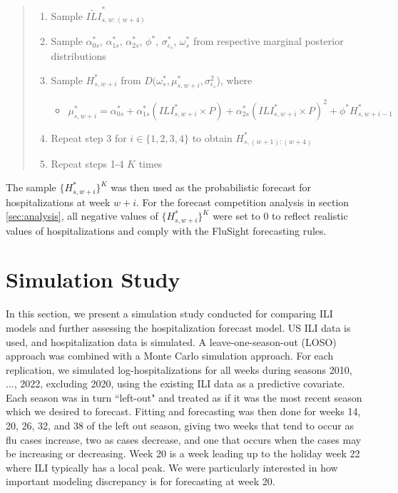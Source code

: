 \begin{quote}
\begin{enumerate}[Step 1:]
  \item Sample $\widetilde{ILI}^*_{s,w:(w + 4)}$
  \item Sample $\alpha_{0s}^*$, $\alpha_{1s}^*$, $\alpha_{2s}^*$, $\phi^*$, 
  $\sigma^*_{\epsilon_s}$, $\omega^*_s$ from respective marginal posterior 
  distributions
  \item Sample $H^*_{s,w + i}$ from $D(\omega_s^*, \mu_{s, w + i}^*,\sigma^2_{\epsilon_s}$), where
  \begin{itemize}
    \item[] $\mu_{s,w + i}^* = \alpha_{0s}^* + \alpha_{1s}^* (ILI_{s,w + i}^* \times P) + \alpha_{2s}^* (ILI_{s,w + i}^* \times P)^2 + \phi^* H^*_{s,w + i - 1}$
  \end{itemize}
   \item Repeat step 3 for $i \in \{1,2,3,4\}$ to obtain $H^*_{s,(w + 1):(w + 4)}$
  \item Repeat steps 1-4 $K$ times
\end{enumerate}
\end{quote}
The sample $\{H^*_{s,w + i}\}^K$ was then used as the probabilistic forecast 
for hospitalizations at week $w + i$. For the forecast competition analysis in 
section \ref{sec:analysis}, all negative values of $\{H^*_{s,w + i}\}^K$ were 
set to 0 to reflect realistic values of hospitalizations and comply with the 
FluSight forecasting rules.


















\section{Simulation Study} \label{sec:simulation2}
In this section, we present a simulation study conducted for comparing ILI 
models and further assessing the hospitalization forecast model. US ILI data 
is used, and hospitalization data is simulated. 
A leave-one-season-out (LOSO) approach was combined with a Monte Carlo 
simulation approach. For each replication, we simulated log-hospitalizations 
for all weeks during seasons 2010, ..., 2022, excluding 2020, using the 
existing ILI data as a predictive covariate. Each season was in turn 
``left-out" and treated as if it was the most recent season which we desired 
to forecast. Fitting and forecasting was then done for weeks 14, 20, 26, 32, 
and 38 of the left out season, giving two weeks that tend to occur as flu 
cases increase, two as cases decrease, and one that occurs when the cases may 
be increasing or decreasing. Week 20 is a week leading up to the holiday week 
22 where ILI typically has a local peak. We were particularly interested in 
how important modeling discrepancy is for forecasting at week 20.


